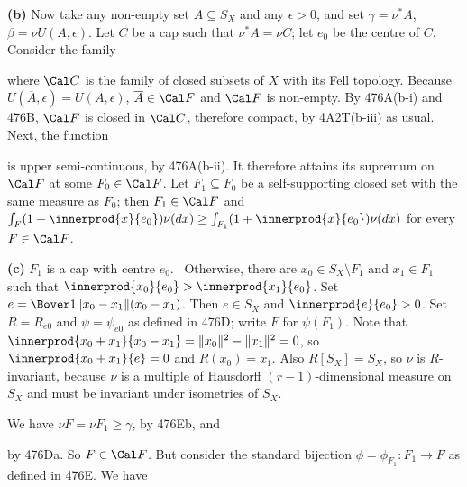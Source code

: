 {\medskip

{\bf (b)} Now take any non-empty set $A\subseteq S_X$ and any
$\epsilon>0$, and set $\gamma=\nu^*A$, $\beta=\nu U(A,\epsilon)$.
Let $C$ be a cap such that $\nu^*A=\nu C$;  let $e_0$ be the centre of
$C$.   Consider the family


\noindent where $\Cal C$ is the family of closed subsets of $X$ with its
Fell topology.
Because $U(\overline{A},\epsilon)=U(A,\epsilon)$,
$\overline{A}\in\Cal F$ and $\Cal F$ is non-empty.   By
476A(b-i) and 476B, $\Cal F$ is closed in
$\Cal C$, therefore compact, by 4A2T(b-iii) as usual.   Next, the function


\noindent is upper semi-continuous, by 476A(b-ii).
It therefore attains its
supremum on $\Cal F$ at some $F_0\in\Cal F$.   Let $F_1\subseteq F_0$ be
a self-supporting closed set with the same measure as $F_0$;  then
$F_1\in\Cal F$ and $\int_F(1+\innerprod{x}{e_0})\nu (dx)
\ge\int_{F_1}(1+\innerprod{x}{e_0})\nu(dx)$ for every $F\in\Cal F$.

\medskip

{\bf (c)} $F_1$ is a cap with centre $e_0$.   \Prf\Quer\ Otherwise,
there are $x_0\in S_X\setminus F_1$ and
$x_1\in F_1$ such that $\innerprod{x_0}{e_0}>\innerprod{x_1}{e_0}$.
Set $e=\Bover1{\|x_0-x_1\|}(x_0-x_1)$.   Then $e\in S_X$ and
$\innerprod{e}{e_0}>0$.   Set $R=R_{e0}$ and $\psi=\psi_{e0}$ as defined
in 476D;  write $F$ for $\psi(F_1)$.   Note that
$\innerprod{x_0+x_1}{x_0-x_1}=\|x_0\|^2-\|x_1\|^2=0$, so
$\innerprod{x_0+x_1}{e}=0$ and $R(x_0)=x_1$.   Also $R[S_X]=S_X$, so
$\nu$ is $R$-invariant, because $\nu$ is a multiple of Hausdorff
$(r-1)$-dimensional measure on $S_X$ and must be invariant under
isometries of $S_X$.

We have $\nu F=\nu F_1\ge\gamma$, by 476Eb, and


\noindent by 476Da.   So $F\in\Cal F$.   But consider the standard
bijection $\phi=\phi_{F_1}:F_1\to F$ as defined in 476E.
We have


}
